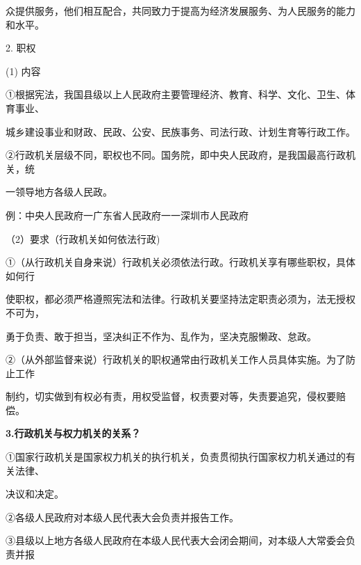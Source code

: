\documentclass[lang=cn,11pt]{elegantbook}
\newcommand{\daofasym}[1]{{\daofasymbolfont #1}}
\newcommand{\daofasym}[1]{#1}
\begin{document}
众提供服务，他们相互配合，共同致力于提高为经济发展服务、为人民服务的能力和水平。\par

2. 职权\par

(1) 内容\par

\daofasym{①}根据宪法，我国县级以上人民政府主要管理经济、教育、科学、文化、卫生、体育事业、\par

城乡建设事业和财政、民政、公安、民族事务、司法行政、计划生育等行政工作。\par

\daofasym{②}行政机关层级不同，职权也不同。国务院，即中央人民政府，是我国最高行政机关，统\par

一领导地方各级人民政。\par

例：中央人民政府一广东省人民政府一一深圳市人民政府\par

（2）要求（行政机关如何依法行政)\par

\daofasym{①}（从行政机关自身来说）行政机关必须依法行政。行政机关享有哪些职权，具体如何行\par

使职权，都必须严格遵照宪法和法律。行政机关要坚持法定职责必须为，法无授权不可为，\par

勇于负责、敢于担当，坚决纠正不作为、乱作为，坚决克服懒政、怠政。\par

\daofasym{②}（从外部监督来说）行政机关的职权通常由行政机关工作人员具体实施。为了防止工作\par

制约，切实做到有权必有责，用权受监督，权责要对等，失责要追究，侵权要赔偿。\par

\textbf{3.行政机关与权力机关的关系？}\par

\daofasym{①}国家行政机关是国家权力机关的执行机关，负责贯彻执行国家权力机关通过的有关法律、\par

决议和决定。\par

\daofasym{②}各级人民政府对本级人民代表大会负责并报告工作。\par

\daofasym{③}县级以上地方各级人民政府在本级人民代表大会闭会期间，对本级人大常委会负责并报\par
\end{document}
